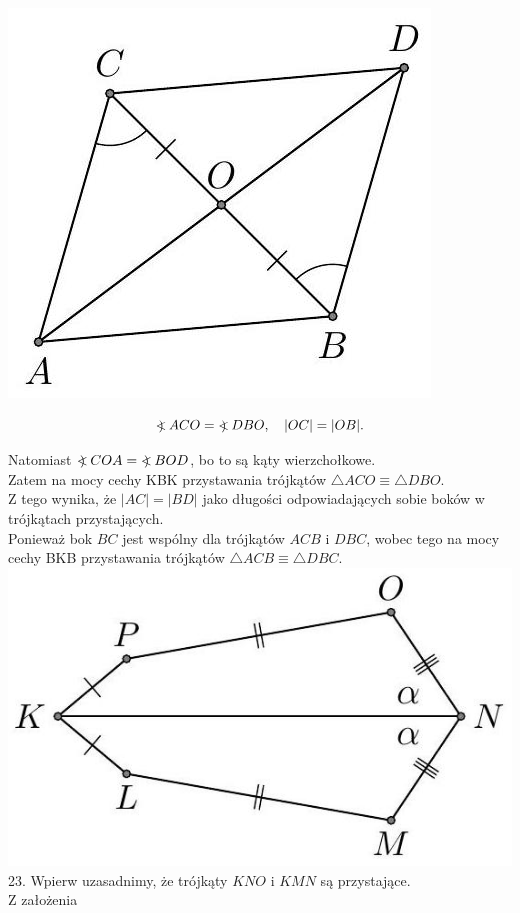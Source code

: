 \documentclass[10pt]{article}
\newcommand\Varangle{\mathop{{<\!\!\!\!\!\text{\small)}}\:}\nolimits}
\begin{document}
\includegraphics[max width=\textwidth, center]{2024_11_21_71f62bd117d375398909g-065(3)}

\[
\Varangle A C O=\Varangle D B O, \quad|O C|=|O B| .
\]

Natomiast \(\Varangle C O A=\Varangle B O D\), bo to są kąty wierzchołkowe.\\
Zatem na mocy cechy KBK przystawania trójkątów \(\triangle A C O \equiv \triangle D B O\).\\
Z tego wynika, że \(|A C|=|B D|\) jako długości odpowiadających sobie boków w trójkątach przystających.\\
Ponieważ bok \(B C\) jest wspólny dla trójkątów \(A C B\) i \(D B C\), wobec tego na mocy cechy BKB przystawania trójkątów \(\triangle A C B \equiv \triangle D B C\).\\
\includegraphics[max width=\textwidth, center]{2024_11_21_71f62bd117d375398909g-065(1)}\\
23. Wpierw uzasadnimy, że trójkąty \(K N O\) i \(K M N\) są przystające.\\
Z założenia
\end{document}

